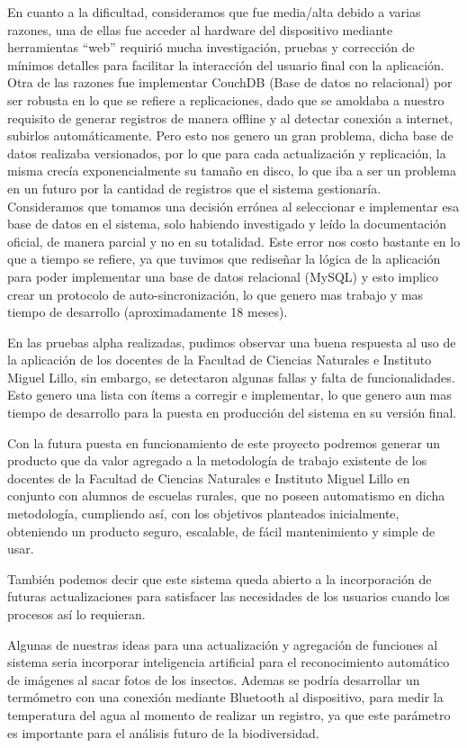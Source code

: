 En cuanto a la dificultad, consideramos que fue media/alta debido a varias razones, una de ellas fue acceder al hardware del dispositivo mediante herramientas ``web'' requirió mucha investigación, pruebas y corrección de mínimos detalles para facilitar la interacción del usuario final con la aplicación. Otra de las razones fue implementar CouchDB (Base de datos no relacional) por ser robusta en lo que se refiere a replicaciones, dado que se amoldaba a nuestro requisito de generar registros de manera offline y al detectar conexión a internet, subirlos automáticamente. Pero esto nos genero un gran problema, dicha base de datos realizaba versionados, por lo que para cada actualización y replicación, la misma crecía exponencialmente su tamaño en disco, lo que iba a ser un problema en un futuro por la cantidad de registros que el sistema gestionaría. Consideramos que tomamos una decisión errónea al seleccionar e implementar esa base de datos en el sistema, solo habiendo investigado y leído la documentación oficial, de manera parcial y no en su totalidad.
Este error nos costo bastante en lo que a tiempo se refiere, ya que tuvimos que rediseñar la lógica de la aplicación para poder implementar una base de datos relacional (MySQL) y esto implico crear un protocolo de auto-sincronización, lo que genero mas trabajo y mas tiempo de desarrollo (aproximadamente 18 meses).

En las pruebas alpha realizadas, pudimos observar una buena respuesta al uso de la aplicación de los docentes de la Facultad de Ciencias Naturales e Instituto Miguel Lillo, sin embargo, se detectaron algunas fallas y falta de funcionalidades. Esto genero una lista con ítems a corregir e implementar, lo que genero aun mas tiempo de desarrollo para la puesta en producción del sistema en su versión final.

Con la futura puesta en funcionamiento de este proyecto podremos generar un producto que da valor agregado a la metodología de trabajo existente de los docentes de la Facultad de Ciencias Naturales e Instituto Miguel Lillo en conjunto con alumnos de escuelas rurales, que no poseen automatismo en dicha metodología, cumpliendo así, con los objetivos planteados inicialmente, obteniendo un producto seguro, escalable, de fácil mantenimiento y simple de usar.

También podemos decir que este sistema queda abierto a la incorporación de futuras actualizaciones para satisfacer las necesidades de los usuarios cuando los procesos así lo requieran.

Algunas de nuestras ideas para una actualización y agregación de funciones al sistema seria incorporar inteligencia artificial para el reconocimiento automático de imágenes al sacar fotos de los insectos. Ademas se podría desarrollar un termómetro con una conexión mediante Bluetooth al dispositivo, para medir la temperatura del agua al momento de realizar un registro, ya que este parámetro es importante para el análisis futuro de la biodiversidad.

\label{chap:conclusiones}
